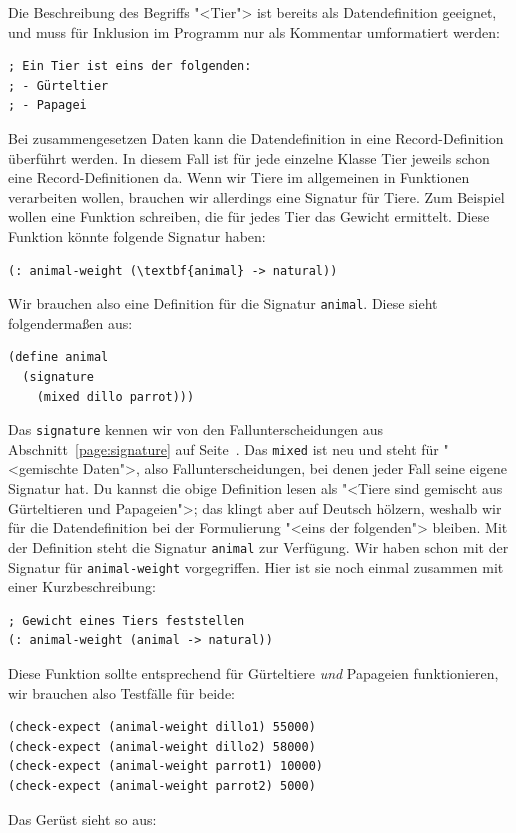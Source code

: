 Die Beschreibung des Begriffs "<Tier"> ist bereits als Datendefinition
geeignet, und muss für Inklusion im Programm nur als Kommentar
umformatiert werden:
%
\begin{lstlisting}
; Ein Tier ist eins der folgenden:
; - Gürteltier
; - Papagei
\end{lstlisting}
%
Bei zusammengesetzen Daten kann die Datendefinition in eine
Record-Definition überführt werden.  In diesem Fall ist für jede
einzelne Klasse
Tier jeweils schon eine Record-Definitionen da.  Wenn wir Tiere im
allgemeinen in
Funktionen verarbeiten wollen, brauchen wir allerdings eine Signatur
für Tiere.  Zum Beispiel wollen eine Funktion schreiben, die für jedes
Tier das Gewicht ermittelt.  Diese Funktion könnte folgende Signatur haben:
%
\begin{lstlisting}
(: animal-weight (\textbf{animal} -> natural))
\end{lstlisting}
%
Wir brauchen also eine Definition für die Signatur \lstinline{animal}.
Diese sieht folgendermaßen aus:
%
\begin{lstlisting}
(define animal
  (signature
    (mixed dillo parrot)))
\end{lstlisting}
%
Das \lstinline{signature} kennen wir von den Fallunterscheidungen aus
Abschnitt~\ref{page:signature} auf Seite~\pageref{page:signature}.
Das \lstinline{mixed} ist neu und steht
für "<gemischte Daten">, also Fallunterscheidungen, bei denen jeder
Fall seine eigene Signatur hat.  Du kannst die obige Definition lesen als
"<Tiere sind gemischt aus Gürteltieren und Papageien">; das klingt
aber auf Deutsch hölzern, weshalb wir für die Datendefinition bei der
Formulierung "<eins der folgenden"> bleiben.  Mit der Definition steht
die Signatur \lstinline{animal} zur Verfügung.  Wir haben schon mit der
Signatur für \lstinline{animal-weight} vorgegriffen.  Hier ist sie noch
einmal zusammen mit einer Kurzbeschreibung:
%
\begin{lstlisting}
; Gewicht eines Tiers feststellen
(: animal-weight (animal -> natural))
\end{lstlisting}
%
Diese Funktion sollte entsprechend für Gürteltiere \emph{und}
Papageien funktionieren, wir brauchen also Testfälle für beide:
%
\begin{lstlisting}
(check-expect (animal-weight dillo1) 55000)
(check-expect (animal-weight dillo2) 58000)
(check-expect (animal-weight parrot1) 10000)
(check-expect (animal-weight parrot2) 5000)
\end{lstlisting}
%
Das Gerüst sieht so aus:
